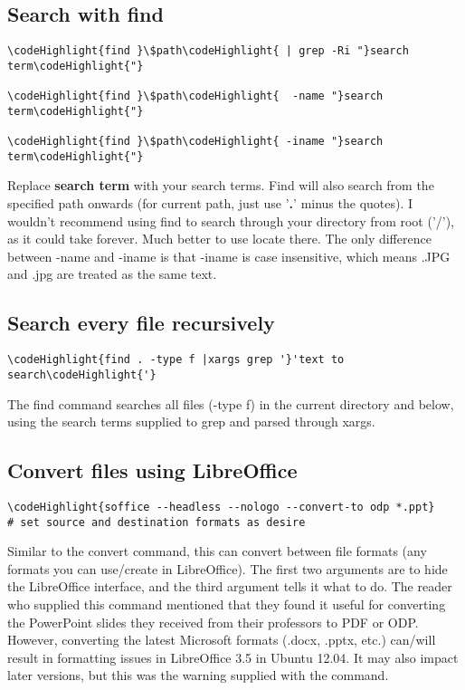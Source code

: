 \documentclass[12pt,a4paper]{article}
\begin{document}
\subsection{Search with find}
\begin{Verbatim}[commandchars=\\\{\}]
\codeHighlight{find }\$path\codeHighlight{ | grep -Ri "}search term\codeHighlight{"}

\codeHighlight{find }\$path\codeHighlight{  -name "}search term\codeHighlight{"}

\codeHighlight{find }\$path\codeHighlight{ -iname "}search term\codeHighlight{"}
\end{Verbatim}
Replace \textbf{search term} with your search terms.  Find will also search from the specified path onwards (for current path, just use '\textbf{.}' minus the quotes).  I wouldn't recommend using find to search through your directory from root ('/'), as it could take forever.  Much better to use locate there.  The only difference between -name and -iname is that -iname is case insensitive, which means .JPG and .jpg are treated as the same text.

\subsection{Search every file recursively}
\begin{Verbatim}[commandchars=\\\{\}]
\codeHighlight{find . -type f |xargs grep '}'text to search\codeHighlight{'}
\end{Verbatim}
The find command searches all files (-type f) in the current directory and below, using the search terms supplied to grep and parsed through xargs.

\subsection{Convert files using LibreOffice}
\begin{Verbatim}[commandchars=\\\{\}]
\codeHighlight{soffice --headless --nologo --convert-to odp *.ppt}
# set source and destination formats as desire
\end{Verbatim}
Similar to the convert command, this can convert between file formats (any formats you can use/create in LibreOffice).  The first two arguments are to hide the LibreOffice interface, and the third argument tells it what to do.  The reader who supplied this command mentioned that they found it useful for converting the PowerPoint slides they received from their professors to PDF or ODP.  However, converting the latest Microsoft formats (.docx, .pptx, etc.) can/will result in formatting issues in LibreOffice 3.5 in Ubuntu 12.04.  It may also impact later versions, but this was the warning supplied with the command.
\end{document}
